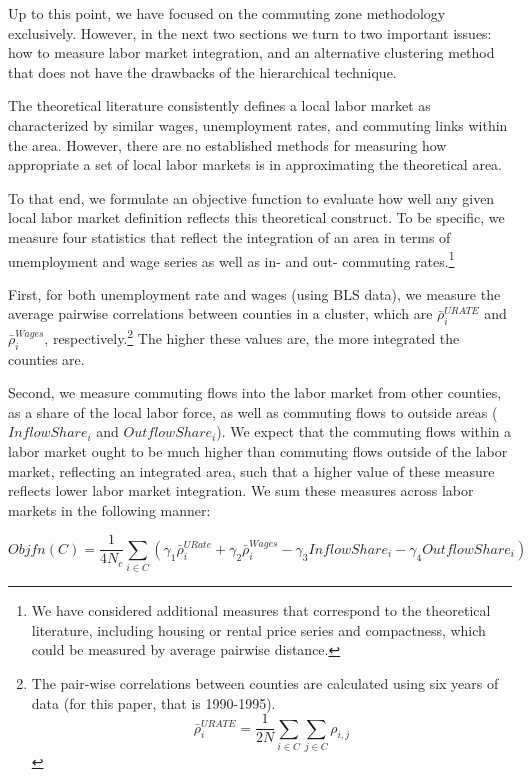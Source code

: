 Up to this point, we have focused on the commuting zone methodology exclusively. However, in the next two sections we turn to two important issues: how to measure labor market integration, and an alternative clustering method that does not have the drawbacks of the hierarchical technique.

The theoretical literature consistently defines a local labor market as characterized by similar wages, unemployment rates, and commuting links within the area. However, there are no established methods for measuring how appropriate a set of local labor markets is in approximating the theoretical area.

To that end, we formulate an objective function to evaluate how well any given local labor market definition reflects this theoretical construct. To be specific, we measure four statistics that reflect the integration of an area in terms of unemployment and wage series as well as in- and out- commuting rates.\footnote{We have considered additional measures that correspond to the theoretical literature, including housing or rental price series and compactness, which could be measured by average pairwise distance.} 

First, for both unemployment rate and wages (using BLS data), we measure the average pairwise correlations between counties in a cluster, which are $\bar{\rho}_i^{URATE}$ and $\bar{\rho}_i^{Wages}$, respectively.\footnote{The pair-wise correlations between counties are calculated using six years of data (for this paper, that is 1990-1995).
\[
\bar{\rho}_i^{URATE} = \frac{1}{2N} \sum_{i \in C} \sum_{j \in C} \rho_{i,j}
\]} The higher these values are, the more integrated the counties are.

Second, we measure commuting flows into the labor market from other counties, as a share of the local labor force, as well as commuting flows to outside areas ($InflowShare_i$ and $OutflowShare_i$). We expect that the commuting flows within a labor market ought to be much higher than commuting flows outside of the labor market, reflecting an integrated area, such that a higher value of these measure reflects lower labor market integration. We sum these measures across labor markets in the following manner:

\begin{equation}\label{eqn:objfn}
	Objfn(C) = \frac{1}{4N_c} \sum_{i\in C} (\gamma_1 \bar{\rho}^{URate}_i + \gamma_2 \bar{\rho}^{Wages}_i - \gamma_3 InflowShare_i - \gamma_4 OutflowShare_i )
\end{equation}

